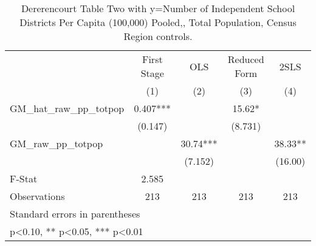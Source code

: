 \begin{table}[htbp]\centering
\def\sym#1{\ifmmode^{#1}\else\(^{#1}\)\fi}
\caption{Dererencourt Table Two with y=Number of Independent School Districts Per Capita (100,000) Pooled,, Total Population, Census Region controls.}
\begin{tabular}{l*{4}{c}}
\toprule
                    & First Stage   &         OLS   &Reduced Form   &        2SLS   \\
                    &\multicolumn{1}{c}{(1)}   &\multicolumn{1}{c}{(2)}   &\multicolumn{1}{c}{(3)}   &\multicolumn{1}{c}{(4)}   \\
\midrule
GM\_hat\_raw\_pp\_totpop&       0.407***&               &       15.62*  &               \\
                    &     (0.147)   &               &     (8.731)   &               \\
\addlinespace
GM\_raw\_pp\_totpop    &               &       30.74***&               &       38.33** \\
                    &               &     (7.152)   &               &     (16.00)   \\
\midrule
F-Stat              &       2.585   &               &               &               \\
Observations        &         213   &         213   &         213   &         213   \\
\bottomrule
\multicolumn{5}{l}{\footnotesize Standard errors in parentheses}\\
\multicolumn{5}{l}{\footnotesize * p<0.10, ** p<0.05, *** p<0.01}\\
\end{tabular}
\end{table}
